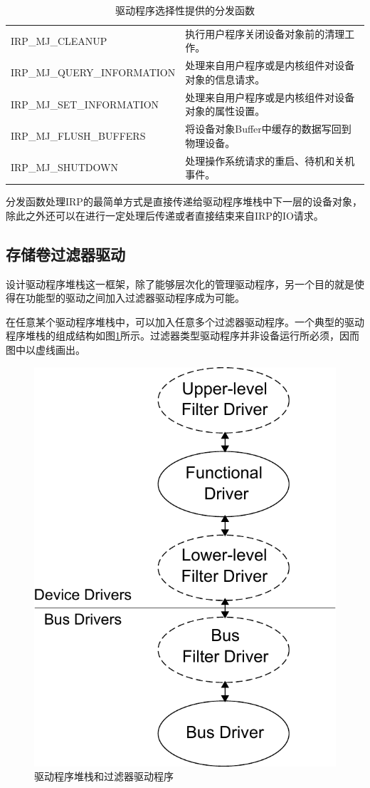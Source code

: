 \begin{table}[!htb]
\centering
\caption{驱动程序选择性提供的分发函数}
\begin{tabular}{|ll|}
\hline IRP\_MJ\_CLEANUP & 执行用户程序关闭设备对象前的清理工作。 \\
       IRP\_MJ\_QUERY\_INFORMATION & 处理来自用户程序或是内核组件对设备对象的信息请求。 \\
       IRP\_MJ\_SET\_INFORMATION & 处理来自用户程序或是内核组件对设备对象的属性设置。 \\
       IRP\_MJ\_FLUSH\_BUFFERS & 将设备对象Buffer中缓存的数据写回到物理设备。 \\
       IRP\_MJ\_SHUTDOWN & 处理操作系统请求的重启、待机和关机事件。 \\
\hline
\end{tabular}
\label{tab:option-handled-major-function}
\end{table}

分发函数处理IRP的最简单方式是直接传递给驱动程序堆栈中下一层的设备对象，除此之外还可以在进行一定处理后传递或者直接结束来自IRP的IO请求。

\subsection{存储卷过滤器驱动}
设计驱动程序堆栈这一框架，除了能够层次化的管理驱动程序，另一个目的就是使得在功能型的驱动之间加入过滤器驱动程序\cite{filterdrv2004}成为可能。

在任意某个驱动程序堆栈中，可以加入任意多个过滤器驱动程序。一个典型的驱动程序堆栈的组成结构如图\ref{fig:io-stack-filter}所示。过滤器类型驱动程序并非设备运行所必须，因而图中以虚线画出。
\begin{figure}[!htb]
\centering
\includegraphics[width=0.4\linewidth]{./graph/io-stack-filter}
\caption{驱动程序堆栈和过滤器驱动程序}
\label{fig:io-stack-filter}
\end{figure}

